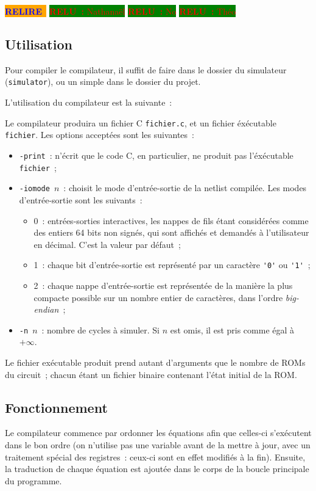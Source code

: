 \documentclass[11pt,a4paper]{article}
\newcommand{\acronym}[1]{\MakeUppercase{#1}}
\newcommand{\relire}{\colorbox{orange}{\textcolor{blue}{\textbf{RELIRE}~}}}
\newcommand{\relu}[1]{\colorbox{green}{\textcolor{red}{\textbf{RELU~:} #1}}}
\begin{document}
\relire
\relu{Nathanaël}
\relu{No}
\relu{Théo}

\subsection{Utilisation}

Pour compiler le compilateur, il suffit de faire
 dans le dossier du simulateur
(\verb!simulator!), ou un simple  dans le dossier du
projet.

L'utilisation du compilateur est la suivante~:


Le compilateur produira un fichier C \verb!fichier.c!, et un fichier
éxécutable \verb!fichier!. Les options acceptées sont les suivantes~:
\begin{itemize}
\item{\verb!-print!~: n'écrit que le code C, en particulier, ne
    produit pas l'éxécutable \verb!fichier!~;}
\item{\verb!-iomode!~$n$~: choisit le mode d'entrée-sortie de la
    netlist compilée. Les modes d'entrée-sortie sont les suivants~:
    \begin{itemize}
    \item{0~: entrées-sorties interactives, les nappes de fils étant
        considérées comme des entiers 64 bits non signés, qui sont
        affichés et demandés à l'utilisateur en décimal. C'est la
        valeur par défaut~;}
    \item{1~: chaque bit d'entrée-sortie est représenté par un
        caractère \verb!'0'! ou \verb!'1'!~;}
    \item{2~: chaque nappe d'entrée-sortie est représentée de la
        manière la plus compacte possible sur un nombre entier de
        caractères, dans l'ordre \textit{big-endian}~;}
    \end{itemize}
}
\item{\verb!-n!~$n$~: nombre de cycles à simuler. Si $n$ est omis, il
    est pris comme égal à $+\infty$.}
\end{itemize}

Le fichier exécutable produit prend autant d'arguments que le nombre
de \acronym{rom}s du circuit~; chacun étant un fichier binaire
contenant l'état initial de la \acronym{rom}.

\subsection{Fonctionnement}
Le compilateur commence par ordonner les équations afin que celles-ci
s'exécutent dans le bon ordre (on n'utilise pas une variable avant de
la mettre à jour, avec un traitement spécial des registres~: ceux-ci
sont en effet modifiés à la fin). Ensuite, la traduction de chaque
équation est ajoutée dans le corps de la boucle principale du
programme.
\end{document}
